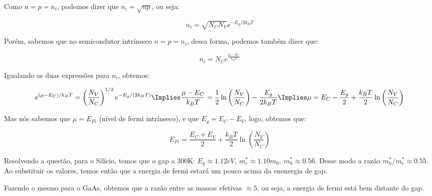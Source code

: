 \begin{enumerate}
Como $n = p = n_i$, podemos dizer que $n_i = \sqrt{np}$, ou seja:

$$n_i = \sqrt{N_CN_V}e^{-E_g/2k_BT}$$

Porém, sabemos que no semicondutor intrínseco $n = p = n_i$, dessa forma, podemos também dizer que:

$$n_i = N_C e^{\frac{\mu - E_C}{k_BT}}$$

Igualando as duas expressões para $n_i$, obtemos:

$$e^{(\mu - E_C)/k_BT} = \left(\frac{N_V}{N_C}\right)^{1/2}e^{-E_g/(2k_BT)}\\
\\
\Implies \frac{\mu - E_C}{k_BT} = \frac{1}{2}\ln{\left(\frac{N_V}{N_C}\right)} - \frac{E_g}{2k_BT}\\
\\
\Implies \mu = E_C - \frac{E_g}{2} + \frac{k_BT}{2}\ln{\left(\frac{N_V}{N_C}\right)}$$

Mas nós sabemos que $\mu = E_{Fi}$ (nível de fermi intrínseco), e que $E_g = E_C - E_V$, logo, obtemos que:

\begin{equation}
  E_{Fi} = \frac{E_C + E_V}{2} + \frac{k_BT}{2}\ln{\left(\frac{N_V}{N_C}\right)} 
\end{equation}

Resolvendo a questão, para o Silício, temos que o gap a 300K: $E_g \approx 1.12eV,\  m_e^*\approx 1.10m_0, \ m_h^* \approx 0.56$. Desse modo a razão $m_h^*/m_e^* \approx 0.55$. Ao substituir os valores, temos então que a energia de fermi estará um pouco acima da enenergia de gap.

Fazendo o mesmo para o GaAs, obtemos que a razão entre as massas efetivas $\approx 5$, ou seja, a energia de fermi está bem distante do gap.
\end{enumerate}
